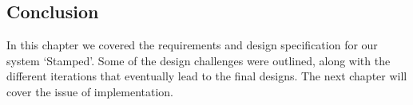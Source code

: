 \subsection{Conclusion}
In this chapter we covered the requirements and design specification for our system `Stamped'. Some of the design challenges were outlined, along with the different iterations that eventually lead to the final designs. The next chapter will cover the issue of implementation.

